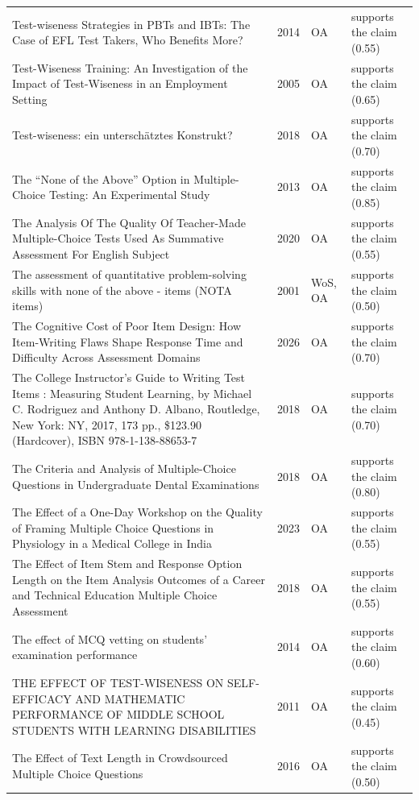 \begin{longtable}{@{}%
  >{\raggedright\arraybackslash}p{}c%
  >{\raggedright\arraybackslash}p{}%
  >{\raggedright\arraybackslash}p{}@{}}
Test-wiseness Strategies in PBTs and IBTs: The Case of EFL Test Takers, Who Benefits More? & 2014 & OA & supports the claim (0.55) \\
Test-Wiseness Training: An Investigation of the Impact of Test-Wiseness in an Employment Setting & 2005 & OA & supports the claim (0.65) \\
Test-wiseness: ein unterschätztes Konstrukt? & 2018 & OA & supports the claim (0.70) \\
The ``None of the Above'' Option in Multiple-Choice Testing: An Experimental Study & 2013 & OA & supports the claim (0.85) \\
The Analysis Of The Quality Of Teacher-Made Multiple-Choice Tests Used As Summative Assessment For English Subject & 2020 & OA & supports the claim (0.55) \\
The assessment of quantitative problem-solving skills with \textquotedbl{}none of the above\textquotedbl{} - items (NOTA items) & 2001 & WoS, OA & supports the claim (0.50) \\
The Cognitive Cost of Poor Item Design: How Item-Writing Flaws Shape Response Time and Difficulty Across Assessment Domains & 2026 & OA & supports the claim (0.70) \\
The College Instructor's Guide to Writing Test Items : Measuring Student Learning, by Michael C. Rodriguez and Anthony D. Albano, Routledge, New York: NY, 2017, 173 pp., \$123.90 (Hardcover), ISBN 978-1-138-88653-7 & 2018 & OA & supports the claim (0.70) \\
The Criteria and Analysis of Multiple-Choice Questions in Undergraduate Dental Examinations & 2018 & OA & supports the claim (0.80) \\
The Effect of a One-Day Workshop on the Quality of Framing Multiple Choice Questions in Physiology in a Medical College in India & 2023 & OA & supports the claim (0.55) \\
The Effect of Item Stem and Response Option Length on the Item Analysis Outcomes of a Career and Technical Education Multiple Choice Assessment & 2018 & OA & supports the claim (0.55) \\
The effect of MCQ vetting on students' examination performance & 2014 & OA & supports the claim (0.60) \\
THE EFFECT OF TEST-WISENESS ON SELF-EFFICACY AND MATHEMATIC PERFORMANCE OF MIDDLE SCHOOL STUDENTS WITH LEARNING DISABILITIES & 2011 & OA & supports the claim (0.45) \\
The Effect of Text Length in Crowdsourced Multiple Choice Questions & 2016 & OA & supports the claim (0.50) \\

\end{longtable}
